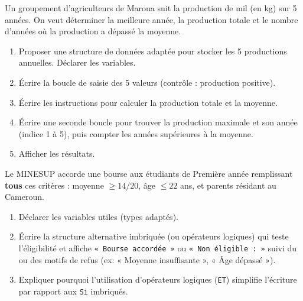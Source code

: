 \documentclass[11pt]{article}
\begin{document}
\begin{exercice}
Un groupement d'agriculteurs de Maroua suit la production de mil (en kg) sur 5 années. On veut déterminer la meilleure année, la production totale et le nombre d'années où la production a dépassé la moyenne.
\begin{enumerate}
    \item Proposer une structure de données adaptée pour stocker les 5 productions annuelles. Déclarer les variables.
    \item Écrire la boucle de saisie des 5 valeurs (contrôle : production positive).
    \item Écrire les instructions pour calculer la production totale et la moyenne.
    \item Écrire une seconde boucle pour trouver la production maximale et son année (indice 1 à 5), puis compter les années supérieures à la moyenne.
    \item Afficher les résultats.
\end{enumerate}
\end{exercice}

\begin{exercice}
Le MINESUP accorde une bourse aux étudiants de Première année remplissant \textbf{tous} ces critères : moyenne $\ge 14/20$, âge $\le 22$ ans, et parents résidant au Cameroun.
\begin{enumerate}
    \item Déclarer les variables utiles (types adaptés).
    \item Écrire la structure alternative imbriquée (ou opérateurs logiques) qui teste l'éligibilité et affiche \texttt{« Bourse accordée »} ou \texttt{« Non éligible : »} suivi du ou des motifs de refus (ex: « Moyenne insuffisante », « Âge dépassé »).
    \item Expliquer pourquoi l'utilisation d'opérateurs logiques (\texttt{ET}) simplifie l'écriture par rapport aux \texttt{Si} imbriqués.
\end{enumerate}
\end{exercice}
\end{document}
